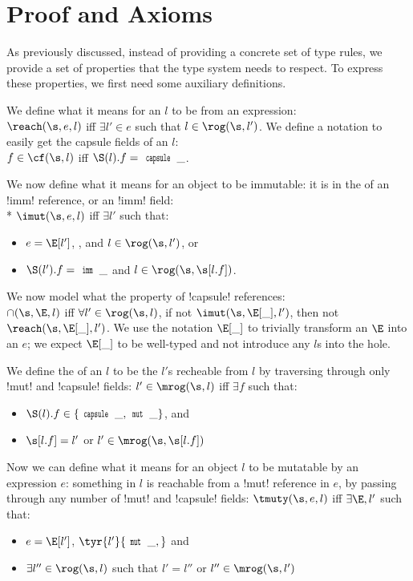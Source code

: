 \section{Proof and Axioms}
\label{s:proof}

As previously discussed, instead of providing a concrete set of type rules, we provide a set of properties that the type system needs to respect.
To express these properties, we first need some auxiliary definitions.

We define what it means for an $l$ to be \reach from an expression:\\
\indent $\reach(\s, e, l)$ iff $\exists l' \in e$ such that $l \in \rog(\s, l')$.
We define a notation to easily get the capsule fields of an $l$:\\
\indent $f \in \cf(\s, l)$ iff $\S(l).f = \Kw{capsule}\,\_$.

\noindent We now define what it means for an object to be immutable: it is in the \rog of an \Q!imm! reference, or an \Q!imm! field:\\*
\indent $\imut(\s, e, l)$ iff $\exists l'$ such that:
\SS[0.25]\begin{itemize}
\item $e = \E[l']$, , and $l \in \rog(\s, l')$, or
\item $\S(l').f = \Kw{imm}\,\_$ and $l \in \rog(\s, \s[l.f])$.
\end{itemize}

\noindent We now model what the \cap property of \Q!capsule! references:\\
\indent $\cap(\s, \E, l)$ iff $\forall l' \in \rog(\s, l)$, if not $\imut(\s, \E[\_], l')$, then 
not $\reach(\s, \E[\_], l')$.
We use the notation $\E[\_]$ to trivially transform an $\E$ into an $e$; we expect $\E[\_]$ to be well-typed and not introduce any $l$s into the hole.

We define the \mrog of an $l$ to be the $l'$s recheable from $l$ by traversing through only \Q!mut! and \Q!capsule! fields:
\indent $l' \in \mrog(\s, l)$ iff $\exists f$ such that:
\SS[0.25]\begin{itemize}
	\item $\S(l).f \in \{\Kw{capsule}\,\_, \Kw{mut}\,\_\}$, and
	\item $\s[l.f] = l'$ or $l' \in \mrog(\s, \s[l.f])$
\end{itemize}

\noindent Now we can define what it means for an object $l$ to be mutatable by an expression $e$: something in $l$ is reachable from a \Q!mut! reference in $e$, by passing through any number of \Q!mut! and \Q!capsule! fields:
\SS[0.25]\indent $\tmuty(\s, e, l)$ iff $\exists \E,l'$ such that:
\begin{itemize}
	\item $e = \E[l']$, $\tyr{l'}{\Kw{mut}\,\_,}$ and
	\item $\exists l'' \in \rog(\s, l)$ such that $l' = l''$ or $l'' \in \mrog(\s, l')$
\end{itemize}

